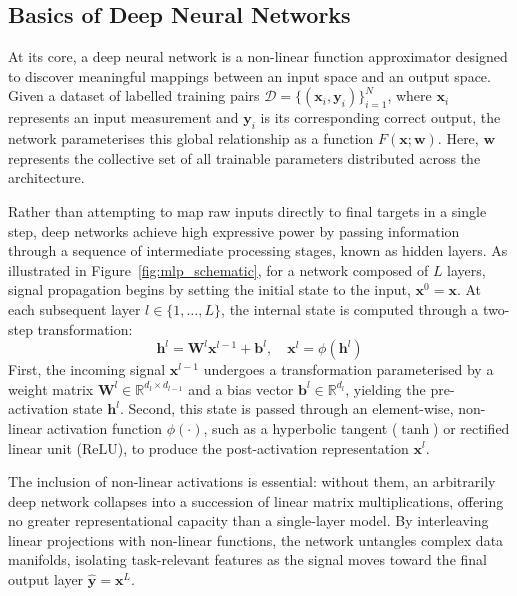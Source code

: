 \documentclass[11pt,oneside]{report}
\begin{document}
\subsection{Basics of Deep Neural Networks}
At its core, a deep neural network is a non-linear function approximator designed to discover meaningful mappings between an input space and an output space. Given a dataset of labelled training pairs $\mathcal{D} = \{(\mathbf{x}_i, \mathbf{y}_i)\}_{i=1}^N$, where $\mathbf{x}_i$ represents an input measurement and $\mathbf{y}_i$ is its corresponding correct output, the network parameterises this global relationship as a function $F(\mathbf{x}; \mathbf{w})$. Here, $\mathbf{w}$ represents the collective set of all trainable parameters distributed across the architecture.

Rather than attempting to map raw inputs directly to final targets in a single step, deep networks achieve high expressive power by passing information through a sequence of intermediate processing stages, known as hidden layers. As illustrated in Figure~\ref{fig:mlp_schematic}, for a network composed of $L$ layers, signal propagation begins by setting the initial state to the input, $\mathbf{x}^0 = \mathbf{x}$. At each subsequent layer $l \in \{1, \dots, L\}$, the internal state is computed through a two-step transformation:
\begin{equation}
	\mathbf{h}^l = \mathbf{W}^l \mathbf{x}^{l-1} + \mathbf{b}^l, \quad \mathbf{x}^l = \phi(\mathbf{h}^l)
\end{equation}
First, the incoming signal $\mathbf{x}^{l-1}$ undergoes a transformation parameterised by a weight matrix $\mathbf{W}^l \in \mathbb{R}^{d_l \times d_{l-1}}$ and a bias vector $\mathbf{b}^l \in \mathbb{R}^{d_l}$, yielding the pre-activation state $\mathbf{h}^l$. Second, this state is passed through an element-wise, non-linear activation function $\phi(\cdot)$, such as a hyperbolic tangent ($\tanh$) or rectified linear unit ($\mathrm{ReLU}$), to produce the post-activation representation $\mathbf{x}^l$. 

The inclusion of non-linear activations is essential: without them, an arbitrarily deep network collapses into a succession of linear matrix multiplications, offering no greater representational capacity than a single-layer model. By interleaving linear projections with non-linear functions, the network untangles complex data manifolds, isolating task-relevant features as the signal moves toward the final output layer $\hat{\mathbf{y}} = \mathbf{x}^L$.
\end{document}
